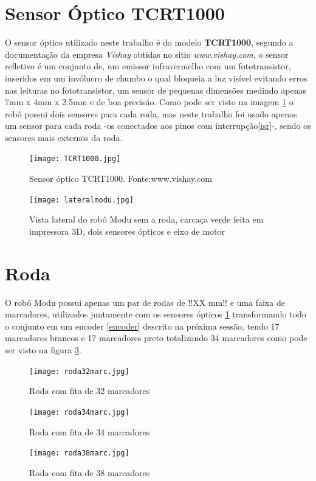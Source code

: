 \documentclass[a4paper,12pt,portuguese]{ufms-cpcx}
\begin{document}
\section{Sensor Óptico TCRT1000}\label{TCRT1000}
O sensor óptico utilizado neste trabalho é do modelo \textbf{TCRT1000}, segundo a documentação da empresa \textit{Vishay} obtidas no sitio \textit{www.vishay.com}, o sensor refletivo é um conjunto de, um emissor infravermelho com um fototransistor, inseridos em um invólucro de chumbo o qual bloqueia a luz visível evitando erros nas leituras no fototransistor, um sensor de pequenas dimensões medindo apenas 7mm x 4mm x 2.5mm e de boa precisão.
Como pode ser visto na imagem \ref{fig:lateralmodu} o robô possui dois sensores para cada roda, mas neste trabalho foi usado apenas um sensor para cada roda -os conectados aos pinos com interrupção\ref{isr}-, sendo os sensores mais externos da roda.
\begin{figure}[H]
	\centering
	\texttt{[image: TCRT1000.jpg]}
	\caption{Sensor óptico TCRT1000. Fonte:www.vishay.com}
\end{figure}
\begin{figure}[H]
	\centering
	\texttt{[image: lateralmodu.jpg]}
	\caption{Vista lateral do robô Modu sem a roda, carcaça verde feita em impressora 3D, dois sensores ópticos e eixo de motor}
	\label{fig:lateralmodu}
\end{figure}

\section{Roda}\label{roda}
O robô Modu possui apenas um par de rodas de !!XX mm!! e uma faixa de marcadores, utilizados juntamente com os sensores ópticos \ref{TCRT1000} transformando todo o conjunto em um encoder \ref{encoder} descrito na próxima sessão, tendo 17 marcadores brancos e 17 marcadores preto totalizando 34 marcadores como pode ser visto na figura \ref{fig:roda34marc}.
\begin{figure}[H]
	\centering
	\texttt{[image: roda32marc.jpg]}
	\caption{Roda com fita de 32 marcadores}
	\label{fig:roda32marc}
\end{figure}
\begin{figure}[H]
	\centering
	\texttt{[image: roda34marc.jpg]}
	\caption{Roda com fita de 34 marcadores}
	\label{fig:roda34marc}
\end{figure}
\begin{figure}[H]
	\centering
	\texttt{[image: roda38marc.jpg]}
	\caption{Roda com fita de 38 marcadores}
	\label{fig:roda38marc}
\end{figure}
\end{document}
